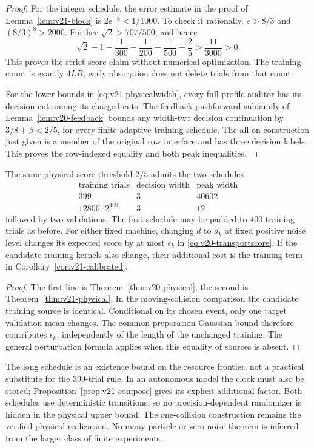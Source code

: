 \begin{proof}
For the integer schedule, the error estimate in the proof of
Lemma~\ref{lem:v21-block} is $2e^{-8}<1/1000$.
To check it rationally, $e>8/3$ and $(8/3)^8>2000$. Further
$\sqrt2>707/500$, and hence
\[
 \sqrt2-1-\frac1{300}-\frac1{200}-\frac1{500}-\frac25
 >\frac{11}{3000}>0.
\]
This proves the strict score claim without numerical optimization.
The training count is exactly $4LR$; early absorption does not delete
trials from that count.

For the lower bounds in \eqref{eq:v21-physicalwidth}, every full-profile
auditor has its decision cut among its charged cuts. The feedback
pushforward subfamily of Lemma~\ref{lem:v20-feedback} bounds any
width-two decision continuation by $3/8+\beta<2/5$, for every finite
adaptive training schedule. The all-on construction just given is a
member of the original row interface and has three decision labels.
This proves the row-indexed equality and both peak inequalities.
\end{proof}

\begin{corollary}\label{cor:v21-regimes}
The same physical score threshold $2/5$ admits the two schedules
\[
 \begin{array}{c|c|c}
 \text{training trials}&\text{decision width}&\text{peak width}\\\hline
 399&3&40602\\
 12800\cdot2^{400}&3&12
 \end{array}
\]
followed by two validations. The first schedule may be padded to $400$
training trials as before. For either fixed machine, changing $d$ to
$d_k$ at fixed positive noise level changes its expected score by at
most $\epsilon_k$ in \eqref{eq:v20-transportscore}. If the candidate
training kernels also change, their additional cost is the training
term in Corollary~\ref{cor:v21-calibrated}.
\end{corollary}
\begin{proof}
The first line is Theorem~\ref{thm:v20-physical}; the second is
Theorem~\ref{thm:v21-physical}. In the moving-collision comparison the
candidate training source is identical. Conditional on its chosen event,
only one target validation mean changes. The common-preparation Gaussian
bound therefore contributes $\epsilon_k$, independently of the length
of the unchanged training. The general perturbation formula applies
when this equality of sources is absent.
\end{proof}

The long schedule is an existence bound on the resource frontier, not a
practical substitute for the $399$-trial rule. In an autonomous model the
clock must also be stored; Proposition~\ref{prop:v21-compose} gives its
explicit additional factor. Both schedules use deterministic transitions,
so no precision-dependent randomizer is hidden in the physical upper
bound. The one-collision construction remains the verified physical
realization. No many-particle or zero-noise theorem is inferred from the
larger class of finite experiments.
